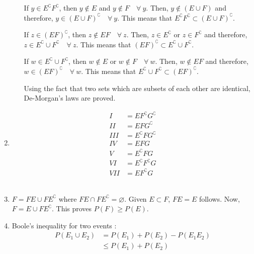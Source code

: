 \begin{enumerate}
\begin{enumerate}
		If $ y \in E^\complement F^\complement $, then $ y \notin E $ and $ y \notin F \quad \forall \ y$.
		Then, $ y \notin (E \cup F) $ and therefore, $ y \in (E \cup F)^\complement \quad \forall \ y$.
		This means that $  E^\complement F^\complement \subset (E \cup F)^\complement $.
		
		If $ z \in (EF)^\complement $, then $ z \notin EF \quad \forall \ z$.
		Then, $ z \in E^\complement$ or $ z \in F^\complement $ and therefore, $ z \in E^\complement \cup F^\complement \quad \forall \ z$.
		This means that $  (EF)^\complement \subset E^\complement \cup F^\complement $.
		
		If $ w \in E^\complement \cup F^\complement $, then $ w \notin E $ or $ w \notin F \quad \forall \ w$.
		Then, $ w \notin EF $ and therefore, $ w \in (EF)^\complement  \quad \forall \ w$.
		This means that $ E^\complement \cup F^\complement \subset (EF)^\complement$.
		
		Using the fact that two sets which are subsets of each other are identical, De-Morgan's laws are proved.
		
	\end{enumerate}
	
	\item \begin{subequations}
		\begin{align}
			I &= E F^\complement G^\complement \\
			II &= E F G^\complement \\
			III &= E^\complement F G^\complement \\
			IV &= EFG \\
			V &= E^\complement F G \\
			VI &= E^\complement F^\complement G \\
			VII &= E F^\complement G
		\end{align}
	\end{subequations}\\
	
	\item $ F = FE \cup F E^\complement $ where $ FE \cap F E^\complement = \varnothing $.
	Given $ E \subset F $, $ FE = E $ follows. Now, $ F = E \cup F E^\complement $.
	This proves $ P(F) \geq P(E) $.
	
	\item Boole's inequality for two events : 
	\begin{subequations}
		\begin{align}
			P(E_1 \cup E_2) &= P(E_1) + P(E_2) - P(E_1 E_2)\\
			& \leq P(E_1) + P(E_2)
		\end{align}
		

\end{subequations}
\end{enumerate}
